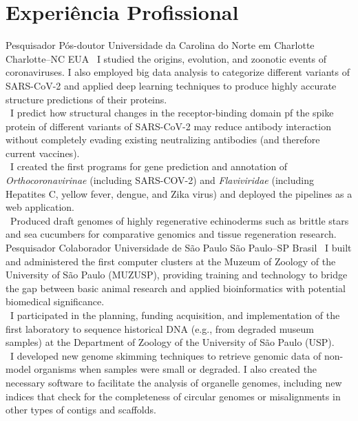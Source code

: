 \documentclass[11pt, letterpaper, sans]{moderncv}
\begin{document}
\section{Experiência Profissional}
{Pesquisador Pós-doutor}
{Universidade da Carolina do Norte em Charlotte}
{Charlotte--NC}
{EUA}
{
\textbullet~I studied the origins, evolution, and zoonotic events of coronaviruses. I also employed big data analysis to categorize different variants of SARS-CoV-2 and applied deep learning techniques to produce highly accurate structure predictions of their proteins.\\
\textbullet~I predict how structural changes in the receptor-binding domain pf the spike protein of different variants of SARS-CoV-2 may reduce antibody interaction without completely evading existing neutralizing antibodies (and therefore current vaccines).\\
\textbullet~I created the first programs for gene prediction and annotation of \textit{Orthocoronavirinae} (including SARS-COV-2) and \textit{Flaviviridae} (including Hepatites C, yellow fever, dengue, and Zika virus) and deployed the pipelines as a web application.\\
\textbullet~Produced draft genomes of highly regenerative echinoderms such as brittle stars and sea cucumbers for comparative genomics and tissue regeneration research.
}
%
{Pesquisador Colaborador}
{Universidade de São Paulo}
{São Paulo--SP}
{Brasil}
{
\textbullet~I built and administered the first computer clusters at the Muzeum of Zoology of the University of São Paulo (MUZUSP), providing training and technology to bridge the gap between basic animal research and applied bioinformatics with potential biomedical significance.\\
\textbullet~I participated in the planning, funding acquisition, and implementation of the first laboratory to sequence historical DNA (e.g., from degraded museum samples) at the Department of Zoology of the University of São Paulo (USP).\\
\textbullet~I developed new genome skimming techniques to retrieve genomic data of non-model organisms when samples were small or degraded. I also created the necessary software to facilitate the analysis of organelle genomes, including new indices that check for the completeness of circular genomes or misalignments in other types of contigs and scaffolds.
}
\end{document}
